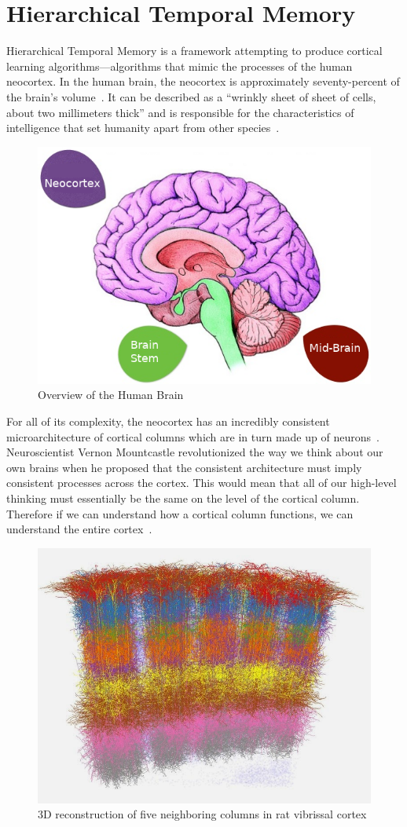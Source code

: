 \documentclass[oneside,12pt,openany]{book}
\begin{document}
	\section{Hierarchical Temporal Memory}
	
	Hierarchical Temporal Memory is a framework attempting to produce cortical learning algorithms---algorithms that mimic the processes of the human neocortex. In the human brain, the neocortex is approximately seventy-percent of the brain's volume~\cite{DiscoveriesBrainWorks}. It can be described as a ``wrinkly sheet of sheet of cells, about two millimeters thick'' and is responsible for the characteristics of intelligence that set humanity apart from other species~\cite{DiscoveriesBrainWorks}. 
	
	\begin{figure}[hbt!]
		\centering
		\includegraphics[width=.5\linewidth]{images/Brain.png}
		\caption{Overview of the Human Brain}
		\label{fig:brain}
	\end{figure}
	
	For all of its complexity, the neocortex has an incredibly consistent microarchitecture of cortical columns which are in turn made up of neurons~\cite{DiscoveriesBrainWorks}. Neuroscientist Vernon Mountcastle revolutionized the way we think about our own brains when he proposed that the consistent architecture must imply consistent processes across the cortex. This would mean that all of our high-level thinking must essentially be the same on the level of the cortical column. Therefore if we can understand how a cortical column functions, we can understand the entire cortex~\cite{DiscoveriesBrainWorks}.	
	
	\begin{figure}[hbt!]
		\centering
		\includegraphics[width=.6\linewidth]{images/CorticalColumns.jpg}
		\caption[3D reconstruction of five neighboring columns in rat vibrissal cortex]{3D reconstruction of five neighboring columns in rat vibrissal cortex\footnotemark}
		\label{CorticalColumn}
	\end{figure}
	
\end{document}
